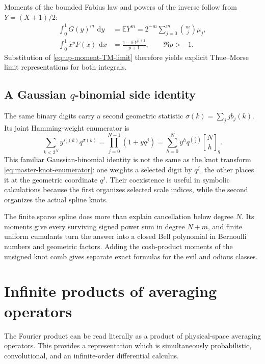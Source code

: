 \documentclass[11pt,oneside]{article}
\numberwithin{equation}{section}
\theoremstyle{definition}
\theoremstyle{remark}
\newcommand{\E}{\mathbb E}
\newcommand{\dd}{\,\mathrm d}
\newcommand{\qbinom}[3]{\genfrac{[}{]}{0pt}{}{#1}{#2}_{#3}}
\begin{document}
Moments of the bounded Fabius law and powers of the inverse follow from
$Y=(X+1)/2$:
\begin{align}
 \int_0^1G(y)^m\,\dd y
 &=\E Y^m
 =2^{-m}\sum_{j=0}^m\binom mj\mu_j,                       \label{eq:G-moment-up}\\
 \int_0^1x^pF(x)\,\dd x
 &=\frac{1-\E Y^{p+1}}{p+1},\qquad \Re p>-1.              \label{eq:F-Mellin-moment}
\end{align}
Substitution of \eqref{eq:up-moment-TM-limit} therefore yields explicit
Thue--Morse limit representations for both integrals.

\subsection{A Gaussian \texorpdfstring{$q$}{q}-binomial side identity}

The same binary digits carry a second geometric statistic
$\sigma(k)=\sum_jjb_j(k)$.  Its joint Hamming-weight enumerator is
\begin{equation}
 \sum_{k<2^N}y^{s_2(k)}q^{\sigma(k)}
 =\prod_{j=0}^{N-1}(1+yq^j)
 =\sum_{h=0}^{N}y^hq^{\binom h2}\qbinom Nhq.               \label{eq:qbinomial-digit-enumerator}
\end{equation}
This familiar Gaussian-binomial identity is not the same as the knot transform
\eqref{eq:master-knot-enumerator}: one weights a selected digit by $q^j$, the
other places it at the geometric coordinate $q^j$.  Their coexistence is useful
in symbolic calculations because the first organizes selected scale indices,
while the second organizes the actual spline knots.

\begin{resultbox}
The finite sparse spline does more than explain cancellation below degree $N$.
Its moments give every surviving signed power sum in degree $N+m$, and finite
uniform cumulants turn the answer into a closed Bell polynomial in Bernoulli
numbers and geometric factors.  Adding the cosh-product moments of the unsigned
knot comb gives separate exact formulas for the evil and odious classes.
\end{resultbox}

\section{Infinite products of averaging operators}
\label{sec:operators}

The Fourier product can be read literally as a product of physical-space
averaging operators.  This provides a representation which is simultaneously
probabilistic, convolutional, and an infinite-order differential calculus.
\end{document}
